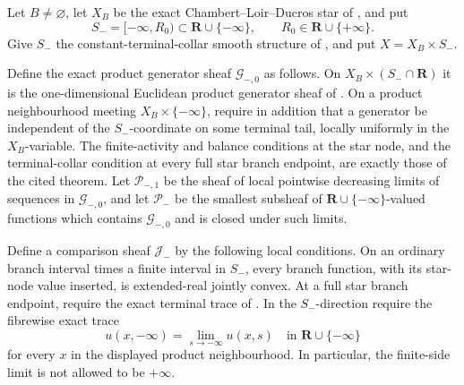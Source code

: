 
\begin{theorem}
\label{thm:p071-infinite-star-infinite-collar-product-collapse}
Let $B\ne\varnothing$, let $X_B$ be the exact
Chambert--Loir--Ducros star of
, and put
\[
 S_-=[-\infty,R_0)\subset\mathbf R\cup\{-\infty\},
 \qquad R_0\in\mathbf R\cup\{+\infty\}.
\]
Give $S_-$ the constant-terminal-collar smooth structure of
, and put
$X=X_B\times S_-$.

Define the exact product generator sheaf $\mathcal G_{-,0}$ as follows.
On $X_B\times(S_-\cap\mathbf R)$ it is the one-dimensional Euclidean
product generator sheaf of
.  On a product
neighbourhood meeting $X_B\times\{-\infty\}$, require in addition that a
generator be independent of the $S_-$-coordinate on some terminal tail,
locally uniformly in the $X_B$-variable.  The finite-activity and balance
conditions at the star node, and the terminal-collar condition at every
full star branch endpoint, are exactly those of the cited theorem.  Let
$\mathcal P_{-,1}$ be the sheaf of local pointwise decreasing limits of
sequences in $\mathcal G_{-,0}$, and let $\mathcal P_-$ be the smallest
subsheaf of $\mathbf R\cup\{-\infty\}$-valued functions which contains
$\mathcal G_{-,0}$ and is closed under such limits.

Define a comparison sheaf $\mathcal J_-$ by the following local
conditions.  On an ordinary branch interval times a finite interval in
$S_-$, every branch function, with its star-node value inserted, is
extended-real jointly convex.  At a full star branch endpoint, require the
exact terminal trace of
.  In the $S_-$-direction
require the fibrewise exact trace
\begin{equation}
 u(x,-\infty)=\lim_{s\to-\infty}u(x,s)
       \quad\text{in }\mathbf R\cup\{-\infty\}
 \label{eq:p071-star-infinite-collar-trace}
\end{equation}
for every $x$ in the displayed product neighbourhood.  In particular,
the finite-side limit is not allowed to be $+\infty$.


\end{theorem}
